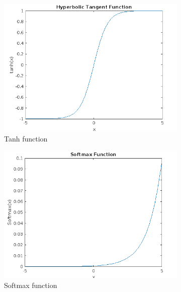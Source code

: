 \begin{figure}
\begin{subfigure}[b]{0.4\textwidth}
        \includegraphics[width=\textwidth]{figures/tanh}
        \caption{Tanh function}
        \label{fig:tahn}
    \end{subfigure}
    \hspace{0.1\textwidth}
    \begin{subfigure}[b]{0.4\textwidth}
        \includegraphics[width=\textwidth]{figures/softmax}
        \caption{Softmax function}
        \label{fig:sigmsoftmaxoid}
    \end{subfigure}
    \begin{subfigure}[b]{0.4\textwidth}

\end{subfigure}
\end{figure}
